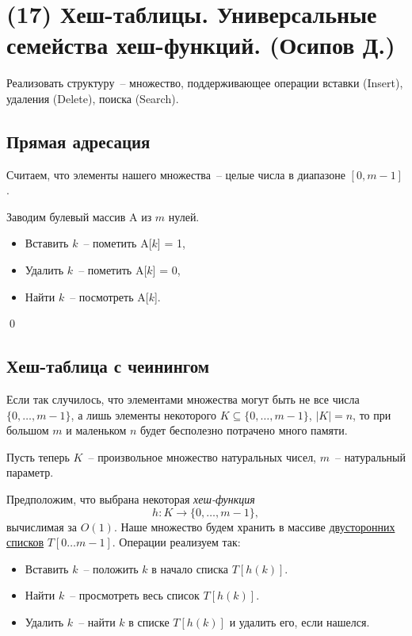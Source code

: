 \section{(17) Хеш-таблицы. Универсальные семейства хеш-функций. (Осипов Д.)}

\begin{problem*}
	Реализовать структуру~-- множество, поддерживающее операции вставки (Insert), удаления (Delete), поиска (Search).
\end{problem*}
\subsection{Прямая адресация}
Считаем, что элементы нашего множества~-- целые числа в диапазоне $[0, m-1]$.

 Заводим булевый массив A из $m$ нулей.
\begin{itemize}
    \item Вставить $k$~-- пометить A[$k$] = 1,
    \item Удалить $k$~-- пометить A[$k$] = 0,
    \item Найти $k$~-- посмотреть A[$k$].
\end{itemize}\qed

\subsection{Хеш-таблица с чеинингом}
Если так случилось, что элементами множества могут быть не все числа $\{0, \ldots, m-1\}$, а лишь элементы некоторого $K \subseteq \{0, \ldots, m-1\}$, $|K| = n$, то при большом $m$ и маленьком $n$ будет бесполезно потрачено много памяти.

Пусть теперь $K$~-- произвольное множество натуральных чисел, $m$~-- натуральный параметр.


Предположим, что выбрана некоторая \textit{хеш-функция} $$h: K \rightarrow \{0, \ldots, m-1\},$$ вычислимая за $O(1)$. Наше множество будем хранить в массиве \underline{двусторонних списков} $T[0\ldots m-1]$. Операции реализуем так:
\begin{itemize}
    \item Вставить $k$~-- положить $k$ в начало списка $T[h(k)]$.
    \item Найти $k$~-- просмотреть весь список $T[h(k)]$.
    \item Удалить $k$~-- найти $k$ в списке $T[h(k)]$ и удалить его, если нашелся.
\end{itemize}


